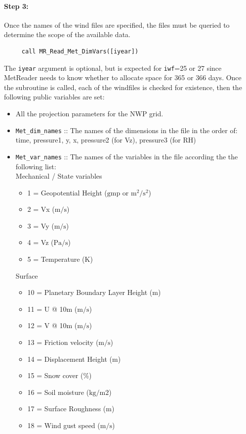 \documentclass[11pt]{article}   %
\begin{document}
\paragraph{Step 3:} Once the names of the wind files are specified, the files must
be queried to determine the scope of the available data.
\begin{verbatim}
     call MR_Read_Met_DimVars([iyear])
\end{verbatim}
The \texttt{iyear} argument is optional, but is expected for \texttt{iwf}=25 or 27
since MetReader needs to know whether to allocate space for 365 or 366 days.
Once the subroutine is called, each of the windfiles is checked for existence, then
the following public variables are set:
\begin{itemize}
\item All the projection parameters for the NWP grid.
\item \texttt{Met\_dim\_names} :: The names of the dimensions in the file in the order of: time,
pressure1, y, x, pressure2 (for Vz), pressure3 (for RH)
\item \texttt{Met\_var\_names} :: The names of the variables in the file according the the
following list:
\\
 Mechanical / State variables
 \begin{itemize}
  \item 1 = Geopotential Height ($\mathrm{gmp}$ or $\mathrm{m^2/s^2}$)
  \item 2 = Vx ($\mathrm{m/s}$)
  \item 3 = Vy ($\mathrm{m/s}$)
  \item 4 = Vz ($\mathrm{Pa/s}$)
  \item 5 = Temperature ($\mathrm{K}$)
 \end{itemize}
 Surface
 \begin{itemize}
  \item 10 = Planetary Boundary Layer Height ($\mathrm{m}$)
  \item 11 = U @ 10m ($\mathrm{m/s}$)
  \item 12 = V @ 10m ($\mathrm{m/s}$)
  \item 13 = Friction velocity ($\mathrm{m/s}$)
  \item 14 = Displacement Height ($\mathrm{m}$)
  \item 15 = Snow cover (\%)
  \item 16 = Soil moisture ($\mathrm{kg/m2}$)
  \item 17 = Surface Roughness ($\mathrm{m}$)
  \item 18 = Wind gust speed ($\mathrm{m/s}$)

\end{itemize}
\end{itemize}
\end{document}
